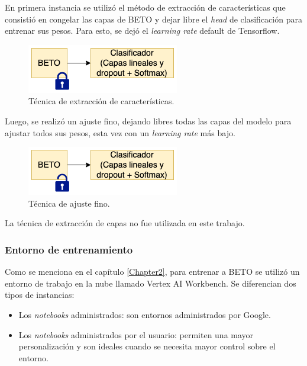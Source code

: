 En primera instancia se utilizó el método de extracción de características que consistió en congelar las capas de BETO y dejar libre el \textit{head} de clasificación para entrenar sus pesos. Para esto, se dejó el \textit{learning rate} default de Tensorflow.

\begin{figure}[htbp]
	\centering
	\includegraphics[width=.4\textwidth]{./Figures/cap3-feature-extraction.png}
	\caption{Técnica de extracción de características.}
	\label{fig:cap3-feature-extraction}
\end{figure}

Luego, se realizó un ajuste fino, dejando libres todas las capas del modelo para ajustar todos sus pesos, esta vez con un \textit{learning rate} más bajo.

\begin{figure}[htbp]
	\centering
	\includegraphics[width=.4\textwidth]{./Figures/cap3-fine-tuning.png}
	\caption{Técnica de ajuste fino.}
	\label{fig:cap3-fine-tuning}
\end{figure}

La técnica de extracción de capas no fue utilizada en este trabajo.

\subsubsection{Entorno de entrenamiento}

Como se menciona en el capítulo \ref{Chapter2}, para entrenar a BETO se utilizó un entorno de trabajo en la nube llamado Vertex AI Workbench. Se diferencian dos tipos de instancias:
\begin{itemize}
	\item Los \textit{notebooks} administrados: son entornos administrados por Google.
	\item Los \textit{notebooks} administrados por el usuario: permiten una mayor personalización y son ideales cuando se necesita mayor control sobre el entorno.
\end{itemize}

